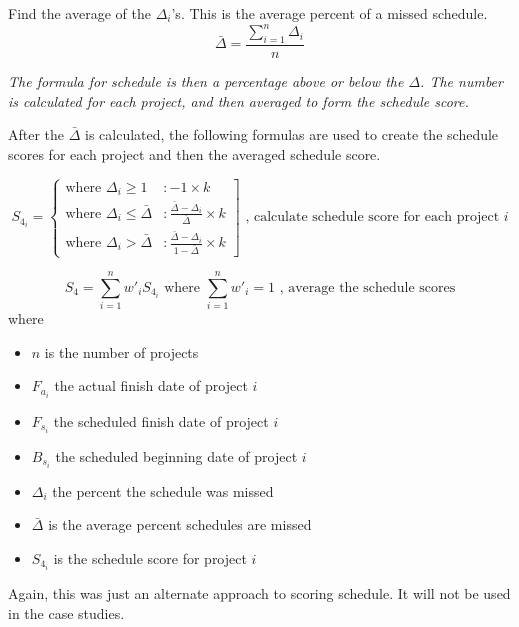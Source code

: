 \documentclass[SDSUThesis.tex]{subfiles}
\begin{document}
                Find the average of the $\Delta_i$'s.  This is the average percent of a missed
                schedule.  
                \begin{displaymath}
                   \bar{\Delta}  = \frac{\sum^n_{i=1}\Delta_i}{n}
                \end{displaymath}
                
                \textit{The formula for schedule is then a percentage above or below the $\Delta$.  
                The number is calculated for each project, and then averaged to form the schedule score.}
                
                After the $\bar{\Delta}$ is calculated, the following formulas are used to create the schedule scores
                for each project and then the averaged schedule score.
            
                \begin{displaymath}
                   S_{4_i} = \left\{
                     \begin{array}{lr}
                        \text{where } \Delta_i \geq 1 & : -1 \times k \\
                       \text{where }  \Delta_i \leq \bar{\Delta} & : \frac{\bar{\Delta} - \Delta_i}{\bar{\Delta}}   \times k  \\
                       \text{where } \Delta_i > \bar{\Delta} & : \frac{\bar{\Delta} - \Delta_i}{1 - \bar{\Delta}} \times k
                     \end{array}
                   \right] \text{   , calculate schedule score for each project $i$}
                \end{displaymath} 
        
                \[
                    S_{4} = \sum\limits^n_{i=1} w'_i S_{4_i} \text{ where } \sum\limits^n_{i=1} w'_i = 1 \text{   , average the schedule scores}
                \]
                where
                \begin{itemize}
                    \item $n$ is the number of projects
                    \item $F_{a_i}$ the actual finish date of project $i$
                    \item $F_{s_i}$ the scheduled finish date of project $i$
                    \item $B_{s_i}$ the scheduled beginning date of project $i$
                    \item $\Delta_i$ the percent the schedule was missed
                    \item $\bar{\Delta}$ is the average percent schedules are missed
                    \item $S_{4_i}$ is the schedule score for project $i$
                \end{itemize}
                Again, this was just an alternate approach to scoring schedule.  
                It will not be used in the case studies.
\end{document}
